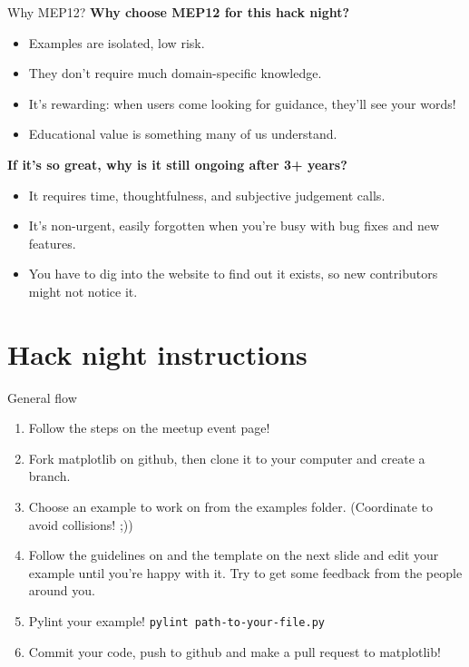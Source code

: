 \documentclass{beamer}
\begin{document}
\begin{frame}{Why MEP12?}
	\vskip8pt
	\alert{\textbf{Why choose MEP12 for this hack night?}}
	\begin{itemize}
		\item Examples are isolated, low risk.
		\item They don’t require much domain-specific knowledge.
		\item It’s rewarding: when users come looking for guidance, they'll see your words!
		\item Educational value is something many of us understand.
	\end{itemize}
	
	\vskip10pt
	\alert{\textbf{If it’s so great, why is it still ongoing after 3+ years?}}
	\begin{itemize}
		\item It requires time, thoughtfulness, and subjective judgement calls.
		\item It's non-urgent, easily forgotten when you're busy with bug fixes and new features.
		\item You have to dig into the website to find out it exists, so new contributors might not notice it.
	\end{itemize}
\end{frame}

\section{Hack night instructions}

\begin{frame}
	\centering
\end{frame}


\begin{frame}{General flow}
	\begin{enumerate}
		\item Follow the steps on the meetup event page!\\[8pt]
		\item Fork matplotlib on github, then clone it to your computer and create a branch.\\[8pt]
		\item Choose an example to work on from the examples folder.  \alert{(Coordinate to avoid collisions! ;))}\\[8pt]
		\item Follow the guidelines on  and the template on the next slide and edit your example until you're happy with it.  Try to get some feedback from the people around you.\\[8pt]
		\item Pylint your example!  \alert{\texttt{pylint path-to-your-file.py}}\\[8pt]
		\item Commit your code, push to github and make a pull request to matplotlib!
	\end{enumerate}
	

\end{frame}
\end{document}
